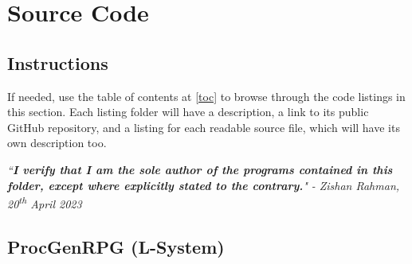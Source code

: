 \chapter{Source Code} \label{Code}

\section{Instructions}



If needed, use the table of contents at \ref{toc} to browse through the code listings in this section. Each listing folder will have a description, a link to its public GitHub repository, and a listing for each readable source file, which will have its own description too.

\textit{``\textbf{I verify that I am the sole author of the programs contained in this folder, except where explicitly stated to the contrary.}"}
\textit{- Zishan Rahman, 20\textsuperscript{th} April 2023}

\section{ProcGenRPG (L-System)}

